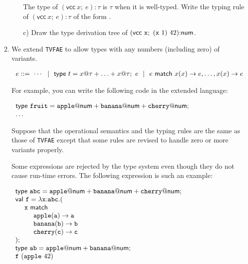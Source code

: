 \begin{enumerate}
\begin{enumerate}
    The type of
    $(\textsf{vcc}\ {x};\ {e}){:}\tau$ is $\tau$ when it is well-typed.
    Write the typing rule of $(\textsf{vcc}\ {x};\ {e}){:}\tau$
    of the form .
  \item[c)] Draw the type derivation tree of
    $(\textsf{vcc}\ {\texttt{x}};\ {\eapp{(\eapp{\texttt{x}}{1})}{42}}){:}\textsf{num}$.
\end{enumerate}

\item We extend \texttt{TVFAE} to allow types with any numbers (including zero) of variants.

$
  \begin{array}{l}
    e ::=\ \cdots\synsep{\textsf{type}}\ t=x@\tau+\ldots+x@\tau;\ e\synsep
           e\ {\textsf{match}}\ x(x)\rightarrow e,\ldots,x(x)\rightarrow e \\
  \end{array}
$

For example, you can write the following code in the extended language:

$
  \begin{array}{l}
    {\textsf{type}}\ \texttt{fruit}=\texttt{apple}@\numt+\texttt{banana}@\numt+\texttt{cherry}@\numt;\\
    \ldots
  \end{array}
$

Suppose that the operational semantics and the typing rules are the same as
those of \texttt{TVFAE} except that some rules are revised to handle zero or more
variants properly.

Some expressions are rejected by the type system even though
they do not cause run-time errors. The following expression is such an example:

$
  \begin{array}{l}
    \textsf{type}\ \texttt{abc}=\texttt{apple}@\numt+\texttt{banana}@\numt+\texttt{cherry}@\numt;\\
    \textsf{val}\ \texttt{f}=\efun{\texttt{x}{:}\texttt{abc}}{(}\\
    \ \ \ \ \texttt{x}\ \textsf{match} \\
    \ \ \ \ \ \ \ \ \texttt{apple}(\texttt{a})\rightarrow\texttt{a} \\
    \ \ \ \ \ \ \ \ \texttt{banana}(\texttt{b})\rightarrow\texttt{b} \\
    \ \ \ \ \ \ \ \ \texttt{cherry}(\texttt{c})\rightarrow\texttt{c} \\
    );\\
    \textsf{type}\ \texttt{ab}=\texttt{apple}@\numt+\texttt{banana}@\numt;\\
    \eapp{\texttt{f}}{(\eapp{\texttt{apple}}{42})}
  \end{array}
$


\end{enumerate}
